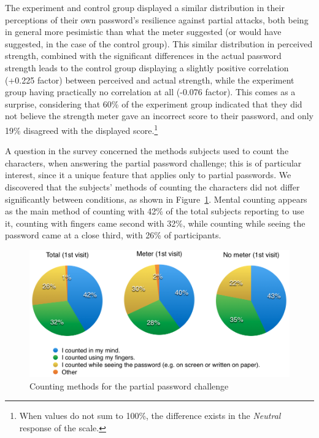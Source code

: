     The experiment and control group displayed a similar distribution in their perceptions of their own password's resilience against partial attacks, both being in general more pesimistic than what the meter suggested (or would have suggested, in the case of the control group). This similar distribution in perceived strength, combined with the significant differences in the actual password strength leads to the control group displaying a slightly positive correlation (+0.225 factor) between perceived and actual strength, while the experiment group having practically no correlation at all (-0.076 factor). This comes as a surprise, considering that 60\% of the experiment group indicated that they did not believe the strength meter gave an incorrect score to their password, and only 19\% disagreed with the displayed score.\footnote{When values do not sum to 100\%, the difference exists in the \emph{Neutral} response of the scale.}

    A question in the survey concerned the methods subjects used to count the characters, when answering the partial password challenge; this is of particular interest, since it a unique feature that applies only to partial passwords. We discovered that the subjects' methods of counting the characters did not differ significantly between conditions, as shown in Figure~\ref{fig:counting-methods}. Mental counting appears as the main method of counting with 42\% of the total subjects reporting to use it, counting with fingers came second with 32\%, while counting while seeing the password came at a close third, with 26\% of participants.

    \begin{figure}[htpb]
      \centering
      \includegraphics[width=\textwidth]{Images/counting}
      \caption{Counting methods for the partial password challenge}
      \label{fig:counting-methods}
    \end{figure}

